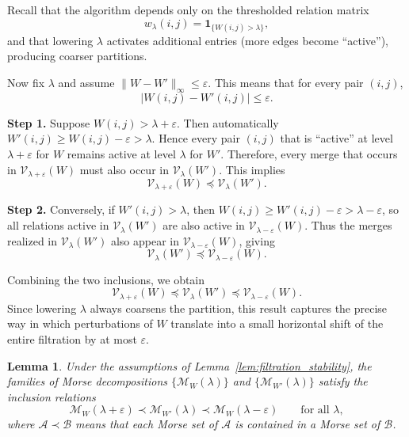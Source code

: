 \documentclass{article}
\theoremstyle{definition}
\theoremstyle{plain}
\newtheorem{lemma}{Lemma}
\theoremstyle{remark}
\newcommand{\1}{\mathbbm{1}}  %
\renewenvironment{proof}{{\bf Proof:\ }}{\qedsymbol}%
\begin{document}
\begin{proof}
Recall that the algorithm depends only on the thresholded relation
matrix
\[
w_\lambda(i,j) = \mathbf{1}_{\{W(i,j) > \lambda\}},
\]
and that lowering $\lambda$ activates additional entries (more edges
become ``active''), producing coarser partitions.

Now fix $\lambda$ and assume $\|W - W'\|_\infty \le \varepsilon$.
This means that for every pair $(i,j)$,
\[
|W(i,j) - W'(i,j)| \le \varepsilon.
\]

\textbf{Step 1.}  
Suppose $W(i,j) > \lambda + \varepsilon$.  
Then automatically $W'(i,j) \ge W(i,j) - \varepsilon > \lambda$.  
Hence every pair $(i,j)$ that is ``active'' at level $\lambda + \varepsilon$
for $W$ remains active at level $\lambda$ for $W'$.  
Therefore, every merge that occurs in $\mathcal V_{\lambda+\varepsilon}(W)$
must also occur in $\mathcal V_{\lambda}(W')$.
This implies
\[
\mathcal V_{\lambda+\varepsilon}(W) \preceq \mathcal V_{\lambda}(W').
\]

\textbf{Step 2.}  
Conversely, if $W'(i,j) > \lambda$, then
$W(i,j) \ge W'(i,j) - \varepsilon > \lambda - \varepsilon$,
so all relations active in $\mathcal V_{\lambda}(W')$ are also active in
$\mathcal V_{\lambda - \varepsilon}(W)$.
Thus the merges realized in $\mathcal V_{\lambda}(W')$ also appear in
$\mathcal V_{\lambda - \varepsilon}(W)$, giving
\[
\mathcal V_{\lambda}(W') \preceq \mathcal V_{\lambda - \varepsilon}(W).
\]

Combining the two inclusions, we obtain
\[
\mathcal V_{\lambda+\varepsilon}(W)
  \preceq
\mathcal V_{\lambda}(W')
  \preceq
\mathcal V_{\lambda-\varepsilon}(W).
\]
Since lowering $\lambda$ always coarsens the partition, this result
captures the precise way in which perturbations of $W$ translate into
a small horizontal shift of the entire filtration by at most $\varepsilon$.
\end{proof}

\begin{lemma} 
\label{lem:morse_refinement}
Under the assumptions of Lemma~\ref{lem:filtration_stability}, 
the families of Morse decompositions 
$\{\mathcal M_W(\lambda)\}$ and $\{\mathcal M_{W'}(\lambda)\}$ 
satisfy the inclusion relations
\[
\mathcal M_W(\lambda+\varepsilon)
  \prec
\mathcal M_{W'}(\lambda)
  \prec
\mathcal M_W(\lambda-\varepsilon)
  \qquad\text{for all }\lambda,
\]
where $\mathcal A \prec \mathcal B$ means that 
each Morse set of $\mathcal A$ is contained in a Morse set of $\mathcal B$.
\end{lemma}
\end{document}
